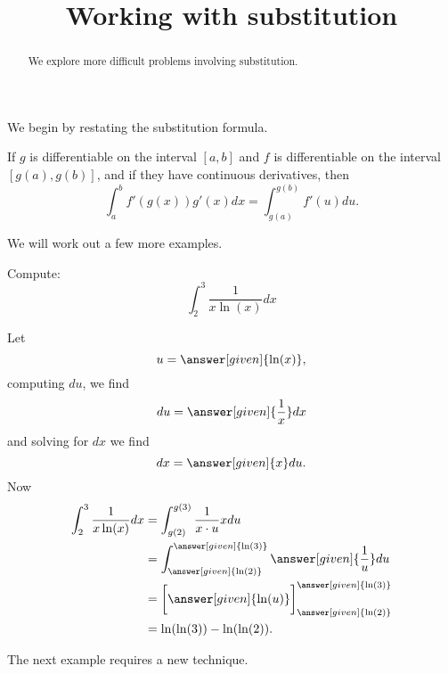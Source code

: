 \documentclass{ximera}
\title[Dig-In:]{Working with substitution}
\begin{document}
\begin{abstract}
We explore more difficult problems involving substitution.
\end{abstract}
\maketitle

We begin by restating the substitution formula.

\begin{theorem} 
If $g$ is differentiable on the interval $[a,b]$ and $f$ is
differentiable on the interval $[g(a),g(b)]$, and if they have continuous derivatives, then
\[
\int_a^b f'(g(x)) g'(x) dx =\int_{g(a)}^{g(b)} f'(u) du.
\]
\end{theorem}


We will work out a few more examples.


\begin{example}
Compute:
\[
\int_{2}^{3} \frac{1}{x\ln(x)} dx
\]
\begin{explanation}
  Let
  \[
  u =\answer[given]{\ln(x)},
  \]
  computing $du$, we find
  \[
  du =\answer[given]{\frac{1}{x}} dx
  \]
  and solving for $dx$ we find
  \[
  dx = \answer[given]{x} du.
  \]
  Now
\begin{align*}
\int_{2}^{3} \frac{1}{x\ln(x)} dx &= \int_{g(2)}^{g(3)} \frac{1}{x \cdot u} x du  \\
&= \int_{\answer[given]{\ln(2)}}^{\answer[given]{\ln(3)}} \answer[given]{\frac{1}{u}} du\\
&= \bigg[ \answer[given]{\ln(u)} \bigg]_{\answer[given]{\ln(2)}}^{\answer[given]{\ln(3)}}\\
& = \ln(\ln(3)) - \ln(\ln(2)).
\end{align*}
\end{explanation}
\end{example}


The next example requires a new technique.
\end{document}
